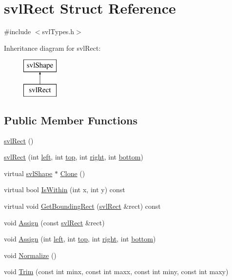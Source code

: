 \hypertarget{structsvl_rect}{}\section{svl\+Rect Struct Reference}
\label{structsvl_rect}


{\ttfamily \#include $<$svl\+Types.\+h$>$}

Inheritance diagram for svl\+Rect\+:\begin{figure}[H]
\begin{center}
\leavevmode
\includegraphics[height=2.000000cm]{dd/d02/structsvl_rect}
\end{center}
\end{figure}
\subsection*{Public Member Functions}
\begin{DoxyCompactItemize}
\item 
\hyperlink{structsvl_rect_a4b5e30c09763e483582b5eef11459728}{svl\+Rect} ()
\item 
\hyperlink{structsvl_rect_a6cbc7247eb1283ef4c48a40f9f12bdce}{svl\+Rect} (int \hyperlink{structsvl_rect_aee6c8420a1d44587061ddc2301ce7126}{left}, int \hyperlink{structsvl_rect_a66ceb775b0be45ce2d4229208e1bb210}{top}, int \hyperlink{structsvl_rect_a277323d99bd51d332973e9f4c94ef081}{right}, int \hyperlink{structsvl_rect_abebdb3b96af5a98d7a952b6a441f7e89}{bottom})
\item 
virtual \hyperlink{structsvl_shape}{svl\+Shape} $\ast$ \hyperlink{structsvl_rect_a0ab014564b0a89c3ca7827fabe4a3456}{Clone} ()
\item 
virtual bool \hyperlink{structsvl_rect_a902cdd64176ef3b0f8b9bf6ec765eb8b}{Is\+Within} (int x, int y) const 
\item 
virtual void \hyperlink{structsvl_rect_a67c503e5c9786eaa5db09d036b50081d}{Get\+Bounding\+Rect} (\hyperlink{structsvl_rect}{svl\+Rect} \&rect) const 
\item 
void \hyperlink{structsvl_rect_a82eb80ea151de2e80a0bc05edb86e6e0}{Assign} (const \hyperlink{structsvl_rect}{svl\+Rect} \&rect)
\item 
void \hyperlink{structsvl_rect_a117afb790f25ab7ac6736267d8e3fc29}{Assign} (int \hyperlink{structsvl_rect_aee6c8420a1d44587061ddc2301ce7126}{left}, int \hyperlink{structsvl_rect_a66ceb775b0be45ce2d4229208e1bb210}{top}, int \hyperlink{structsvl_rect_a277323d99bd51d332973e9f4c94ef081}{right}, int \hyperlink{structsvl_rect_abebdb3b96af5a98d7a952b6a441f7e89}{bottom})
\item 
void \hyperlink{structsvl_rect_a210eeef09846b33ede5425949ebb4b0c}{Normalize} ()
\item 
void \hyperlink{structsvl_rect_a31eda9994c2a4d0f008228556424d12c}{Trim} (const int minx, const int maxx, const int miny, const int maxy)
\end{DoxyCompactItemize}
